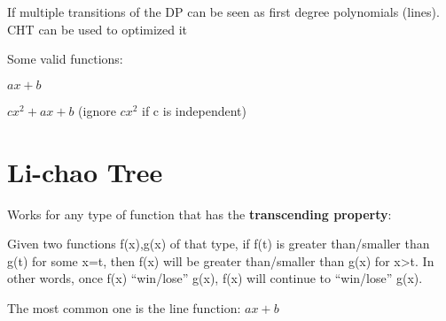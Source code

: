     If multiple transitions of the DP can be seen as 
    first degree polynomials (lines). CHT can be used to optimized it

    Some valid functions:

    $ax + b$
    
    $cx^2 + ax + b$ 
    (ignore $cx^2$ if c is independent)


\section{Li-chao Tree}

    Works for any type of function that has the \textbf{transcending property}:

    Given two functions f(x),g(x) of that type, 
    if f(t) is greater than/smaller than g(t) for some x=t,
    then f(x) will be greater than/smaller than g(x) for x>t.
    In other words, once f(x) “win/lose” g(x), f(x) will continue to “win/lose” g(x).

    The most common one is the line function: $ ax + b $
    